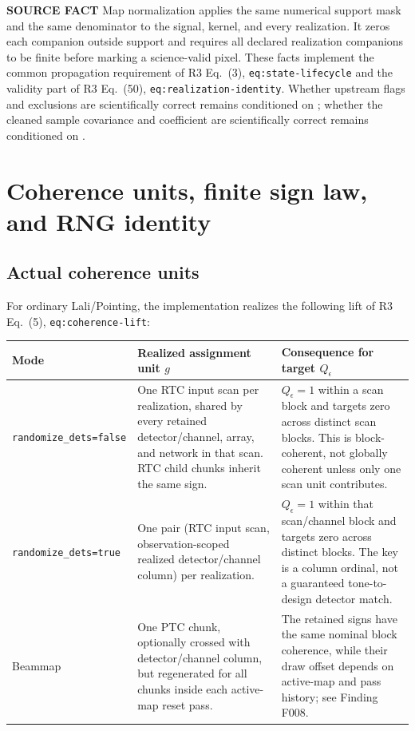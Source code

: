 \documentclass[10pt]{article}
\newcommand{\srclabel}{\textbf{SOURCE FACT}}
\newcommand{\rthree}[2]{R3 Eq.~(#1), \texttt{#2}}
\begin{document}
\srclabel{} Map normalization applies the same numerical support mask and the
same denominator to the signal, kernel, and every realization.  It zeros each
companion outside support and requires all declared realization companions to
be finite before marking a science-valid pixel.  These facts implement the
common propagation requirement of \rthree{3}{eq:state-lifecycle} and the
validity part of \rthree{50}{eq:realization-identity}.  Whether upstream flags
and exclusions are scientifically correct remains conditioned on
; whether the cleaned sample covariance and coefficient are
scientifically correct remains conditioned on .

\section{Coherence units, finite sign law, and RNG identity}
\label{sec:rng}

\subsection{Actual coherence units}

For ordinary Lali/Pointing, the implementation realizes the following lift
of \rthree{5}{eq:coherence-lift}:

\begin{longtable}{@{}p{}p{}p{}@{}}
\toprule
Mode & Realized assignment unit $g$ & Consequence for target $Q_\epsilon$ \\
\midrule
\endhead
\texttt{randomize\_dets=false} &
One RTC input scan per realization, shared by every retained detector/channel,
array, and network in that scan.  RTC child chunks inherit the same sign. &
$Q_\epsilon=1$ within a scan block and targets zero across distinct scan
blocks.  This is block-coherent, not globally coherent unless only one scan
unit contributes. \\
\texttt{randomize\_dets=true} &
One pair (RTC input scan, observation-scoped realized detector/channel column)
per realization. &
$Q_\epsilon=1$ within that scan/channel block and targets zero across
distinct blocks.  The key is a column ordinal, not a guaranteed
tone-to-design detector match. \\
Beammap &
One PTC chunk, optionally crossed with detector/channel column, but regenerated
for all chunks inside each active-map reset pass. &
The retained signs have the same nominal block coherence, while their draw
offset depends on active-map and pass history; see Finding F008. \\
\bottomrule
\end{longtable}
\end{document}
